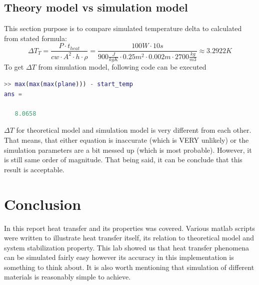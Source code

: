\documentclass[onecolumn]{article}
\begin{document}
\subsection{Theory model vs simulation model}
This section purpose is to compare simulated temperature delta to calculated from stated formula:
\begin{equation}
\Delta T_T = \frac{P \cdot t_{heat}}{cw \cdot A^2 \cdot h \cdot \rho} = \frac{100W \cdot 10s}{900 \frac{J}{kgK} \cdot 0.25 m^2 \cdot 0.002m \cdot 2700 \frac{kg}{m3}} \approx 3.2922K
\end{equation}
To get $\Delta T$ from simulation model, following code can be executed
\begin{lstlisting}[language=Matlab,frame=single,label={lst:autocorr},breaklines=true,caption={Calculation of delta T in simulated heat transfer model for boundary condition 2}]
>> max(max(max(plane))) - start_temp
ans =

   8.0658
\end{lstlisting}
$\Delta T$ for theoretical model and simulation model is very different from each other. That means, that either equation is inaccurate (which is VERY unlikely) or the simulation parameters are a bit messed up (which is most probable). However, it is still same order of magnitude. That being said, it can be conclude that this result is acceptable.

\section{Conclusion}
In this report heat transfer and its properties was covered. Various matlab scripts were written to illustrate heat transfer itself, its relation to theoretical model and system stabilization property. This lab showed us that heat transfer phenomena can be simulated fairly easy however its accuracy in this implementation is something to think about. It is also worth mentioning that simulation of different materials is reasonably simple to achieve.
\end{document}
